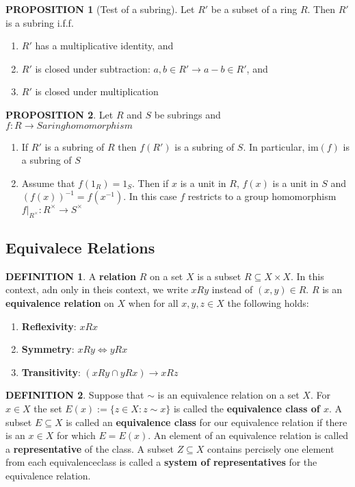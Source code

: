 \documentclass[12pt]{article}
\theoremstyle{definition}
\newtheorem{definition}{DEFINITION}[subsection]
\newtheorem{prop}{PROPOSITION}[subsection]
\begin{document}
\begin{prop}[Test of a subring]
    Let $R'$ be a subset of a ring $R$. Then $R'$ is a subring i.f.f.
    \begin{enumerate}
        \item $R'$ has a multiplicative identity, and
        \item $R'$ is closed under subtraction: $a,b\in R' \rightarrow a-b\in R'$, and
        \item $R'$ is closed under multiplication
    \end{enumerate}
\end{prop}

\begin{prop}
    Let $R$ and $S$ be subrings and $f:R\rightarrow S a ring homomorphism$
    \begin{enumerate}
        \item If $R'$ is a subring of $R$ then $f(R')$ is a subring of $S$. In particular, $\text{im}(f)$ is a subring of $S$
        \item Assume that $f(1_R) = 1_S$. Then if $x$ is a unit in  $R$, $f(x)$ is a unit in $S$ and $(f(x))^{-1} = f(x^{-1})$. In this case $f$ restricts to a group homomorphism $f|_{R^\times}:R^\times \rightarrow S^\times$
    \end{enumerate}
\end{prop}

\subsection{Equivalece Relations}
\begin{definition}
    A \textbf{relation} $R$ on a set $X$ is a subset $R \subseteq X \times X$. In this context, adn only in theis context, we write $xRy$ instead of $(x,y) \in R$. $R$ is an \textbf{equivalence relation} on $X$ when for all $x,y,z \in X$ the following holds:
    \begin{enumerate}
        \item \textbf{Reflexivity}: $xRx$
        \item \textbf{Symmetry}: $xRy \Leftrightarrow yRx$
        \item \textbf{Transitivity}: $(xRy \cap yRx) \rightarrow xRz$
    \end{enumerate}
\end{definition}

\begin{definition}
    Suppose that $\sim$ is an equivalence relation on a set $X$. For $x \in X$ the set $E(x) := \{z \in X: z \sim x\}$ is called the \textbf{equivalence class of $x$}. A subset $E \subseteq X$ is called an \textbf{equivalence class} for our equivalence relation if there is an $x \in X$ for which $E = E(x)$. An element of an equivalence relation is called a \textbf{representative} of the class. A subset $Z \subseteq X$ contains percisely one element from each equivalenceclass is called a \textbf{system of representatives} for the equivalence relation.
\end{definition}
\end{document}
